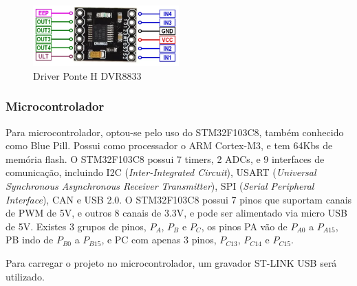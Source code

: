 \begin{figure}[htb]
	\centering
	\includegraphics[width=0.5\textwidth]{figures/DRV8833-Dual-Driver-Pinout}
	\caption{Driver Ponte H DVR8833 \cite{DRV8833_image}}
\end{figure}

\subsubsection{Microcontrolador}

Para microcontrolador, optou-se pelo uso do  STM32F103C8, também conhecido como Blue Pill.
Possui como processador o ARM Cortex-M3, e tem 64Kbs de memória flash. 
O STM32F103C8 possui 7 timers, 2 ADCs, e 9 interfaces de comunicação, incluindo
I2C (\textit{Inter-Integrated Circuit}), USART (\textit{Universal Synchronous
Asynchronous Receiver Transmitter}), SPI (\textit{Serial Peripheral Interface}),
CAN e USB 2.0.
O STM32F103C8 possui 7 pinos que suportam canais de PWM de 5V, e outros 8 canais de 3.3V,  e pode ser alimentado via micro
USB de 5V. Existes 3 grupos de pinos,  $P_{A}$,  $P_{B}$ e  $P_{C}$,  os pinos PA vão de $P_{A0}$ a $P_{A15}$, PB indo de $P_{B0}$ a $P_{B15}$, e PC com apenas 3 pinos, $P_{C13}$, $P_{C14}$ e $P_{C15}$.

Para carregar o projeto no microcontrolador, um gravador ST-LINK USB será utilizado.

